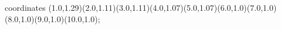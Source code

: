 					coordinates { (1.0,1.29)(2.0,1.11)(3.0,1.11)(4.0,1.07)(5.0,1.07)(6.0,1.0)(7.0,1.0)(8.0,1.0)(9.0,1.0)(10.0,1.0)};